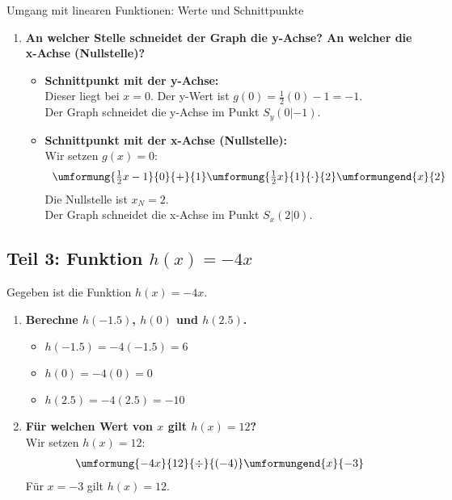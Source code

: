 \begin{loesungsumgebung}{Umgang mit linearen Funktionen: Werte und Schnittpunkte}
\begin{enumerate}[label=(\alph*)]
    \item \textbf{An welcher Stelle schneidet der Graph die y-Achse? An welcher die x-Achse (Nullstelle)?}
    \begin{itemize}
        \item \textbf{Schnittpunkt mit der y-Achse:} \\
        Dieser liegt bei $x=0$. Der y-Wert ist $g(0) = \frac{1}{2}(0) - 1 = -1$. \\
        Der Graph schneidet die y-Achse im Punkt $S_y(0|-1)$.
        \item \textbf{Schnittpunkt mit der x-Achse (Nullstelle):} \\
        Wir setzen $g(x)=0$:
        $$
        \begin{array}{r c l c l}
        \umformung{\frac{1}{2}x - 1}{0}{+}{1}
        \umformung{\frac{1}{2}x}{1}{\cdot}{2}
        \umformungend{x}{2}
        \end{array}
        $$
        Die Nullstelle ist $x_N = 2$. \\
        Der Graph schneidet die x-Achse im Punkt $S_x(2|0)$.
    \end{itemize}
\end{enumerate}

\bigskip %

\subsection*{Teil 3: Funktion $h(x) = -4x$}
Gegeben ist die Funktion $h(x) = -4x$.

\begin{enumerate}[label=(\alph*)]
    \item \textbf{Berechne $h(-1.5)$, $h(0)$ und $h(2.5)$.}
    \begin{itemize}
        \item $h(-1.5) = -4(-1.5) = 6$
        \item $h(0) = -4(0) = 0$
        \item $h(2.5) = -4(2.5) = -10$
    \end{itemize}

    \item \textbf{Für welchen Wert von $x$ gilt $h(x) = 12$?} \\
    Wir setzen $h(x)=12$:
    $$
    \begin{array}{r c l c l}
    \umformung{-4x}{12}{\div}{(-4)}
    \umformungend{x}{-3}
    \end{array}
    $$
    Für $x=-3$ gilt $h(x)=12$.


\end{enumerate}
\end{loesungsumgebung}
